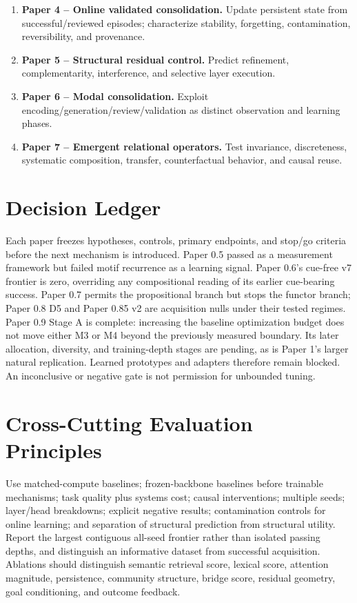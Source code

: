 \documentclass[11pt]{article}
\begin{document}
\begin{enumerate}[leftmargin=*]
\item \textbf{Paper 4 -- Online validated consolidation.} Update persistent state from successful/reviewed episodes; characterize stability, forgetting, contamination, reversibility, and provenance.
\item \textbf{Paper 5 -- Structural residual control.} Predict refinement, complementarity, interference, and selective layer execution.
\item \textbf{Paper 6 -- Modal consolidation.} Exploit encoding/generation/review/validation as distinct observation and learning phases.
\item \textbf{Paper 7 -- Emergent relational operators.} Test invariance, discreteness, systematic composition, transfer, counterfactual behavior, and causal reuse.
\end{enumerate}

\section{Decision Ledger}
Each paper freezes hypotheses, controls, primary endpoints, and stop/go criteria before the next mechanism is introduced. Paper 0.5 passed as a measurement framework but failed motif recurrence as a learning signal. Paper 0.6's cue-free v7 frontier is zero, overriding any compositional reading of its earlier cue-bearing success. Paper 0.7 permits the propositional branch but stops the functor branch; Paper 0.8 D5 and Paper 0.85 v2 are acquisition nulls under their tested regimes. Paper 0.9 Stage A is complete: increasing the baseline optimization budget does not move either M3 or M4 beyond the previously measured boundary. Its later allocation, diversity, and training-depth stages are pending, as is Paper 1's larger natural replication. Learned prototypes and adapters therefore remain blocked. An inconclusive or negative gate is not permission for unbounded tuning.

\section{Cross-Cutting Evaluation Principles}
Use matched-compute baselines; frozen-backbone baselines before trainable mechanisms; task quality plus systems cost; causal interventions; multiple seeds; layer/head breakdowns; explicit negative results; contamination controls for online learning; and separation of structural prediction from structural utility. Report the largest contiguous all-seed frontier rather than isolated passing depths, and distinguish an informative dataset from successful acquisition. Ablations should distinguish semantic retrieval score, lexical score, attention magnitude, persistence, community structure, bridge score, residual geometry, goal conditioning, and outcome feedback.
\end{document}
